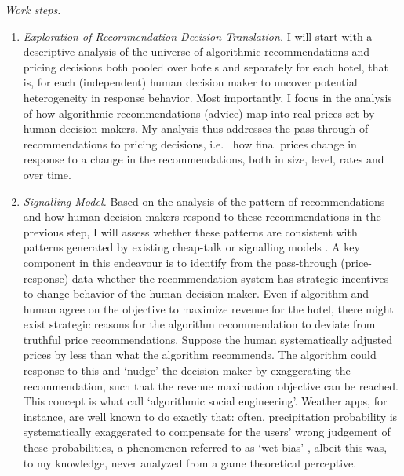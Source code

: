 \documentclass[12pt,a4paper]{article}
\begin{document}
\emph{Work steps.}
\begin{enumerate}
	\item \emph{Exploration of Recommendation-Decision Translation.} I will start with a descriptive analysis of the universe of algorithmic recommendations and pricing decisions both pooled over hotels and separately for each hotel, that is, for each (independent) human decision maker to uncover potential heterogeneity in response behavior.
Most importantly, I focus in the analysis of how algorithmic recommendations (advice) map into real prices set by human decision makers. My analysis thus addresses the pass-through of recommendations to pricing decisions, i.e.~ how final prices change in response to a change in the recommendations, both in size, level, rates and over time.

\item \emph{Signalling Model.} Based on the analysis of the pattern of recommendations and how human decision makers respond to these recommendations in the previous step, I will assess whether these patterns are consistent with patterns generated by existing cheap-talk or signalling models \citep[see][]{crawford1982strategic, sobel2013givingadvice, backus2019empirical}. A key component in this endeavour is to identify from the pass-through (price-response) data whether the recommendation system has strategic incentives to change behavior of the human decision maker. Even if algorithm and human agree on the objective to maximize revenue for the hotel, there might exist strategic reasons for the algorithm recommendation to deviate from truthful price recommendations. Suppose the human systematically adjusted prices by less than what the algorithm recommends. The algorithm could response to this and `nudge' the decision maker by exaggerating the recommendation, such that the revenue maximation objective can be reached. This concept is what \citet{cowgill2020algorithmic} call `algorithmic social engineering'. Weather apps, for instance, are well known to do exactly that: often, precipitation probability is systematically exaggerated to compensate for the users' wrong judgement of these probabilities, a phenomenon referred to as `wet bias' \citep{wetbias1}, albeit this was, to my knowledge, never analyzed from a game theoretical perceptive.


\end{enumerate}
\end{document}
